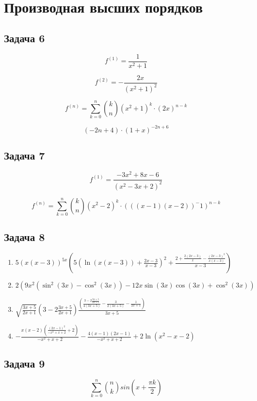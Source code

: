 \documentclass[a4paper,12pt]{article}
\begin{document}
\section{Производная высших порядков}

\subsection{Задача 6}
\[
f^{(1)} = \frac{1}{x^2+1}
\]

\[
f^{(2)} = - \frac{2x}{(x^2+1)^2} 
\]

\[
f^{(n)} = \sum_{k=0}^n \binom{k}{n} (x^2+1)^k \cdot  (2x)^{n-k}
\]


\[
(-2n+4)\cdot (1+x)^{-2n+6}
\]

\subsection{Задача 7}

\[
f^{(1)} = \frac{-3x^2+8x-6}{(x^2-3x+2)^2}
\]

\[
f^{(n)} = \sum_{k=0}^n \binom{k}{n} (x^2-2)^k \cdot  (((x-1)(x-2))^-1)^{n-k}
\]

\subsection{Задача 8}

\begin{enumerate}
    \item $5(x(x - 3))^{5x} \left(5 \left(\ln(x(x - 3)) + \frac{2x - 3}{x - 3}\right)^2 + \frac{2 + \frac{2(2x - 3)}{x} - \frac{(2x - 3)^2}{x(x - 3)}}{x - 3}\right)$
    \item $2 \left(9x^2 (\sin^2(3x) - \cos^2(3x)) - 12x \sin(3x) \cos(3x) + \cos^2(3x)\right)$
    \item $\sqrt{\frac{3x + 5}{2x + 1}} \left(3 - 2 \frac{3x + 5}{2x + 1}\right) \frac{\left(\frac{3 - 2 \frac{3x + 5}{2x + 1}}{4(3x + 5)} - \frac{3}{2(3x + 5)} - \frac{1}{2x + 1}\right)}{3x + 5}$
    \item $-\frac{x(x - 2)\left(\frac{(2x - 1)^2}{-x^2 + x + 2} + 2\right)}{-x^2 + x + 2} - \frac{4(x - 1)(2x - 1)}{-x^2 + x + 2} + 2 \ln(x^2 - x - 2)$
\end{enumerate}

\subsection{Задача 9}

\[
\sum_{k=0}^{n} \binom{n}{k} sin(x + \frac{\pi k}{2})
\]
\end{document}
